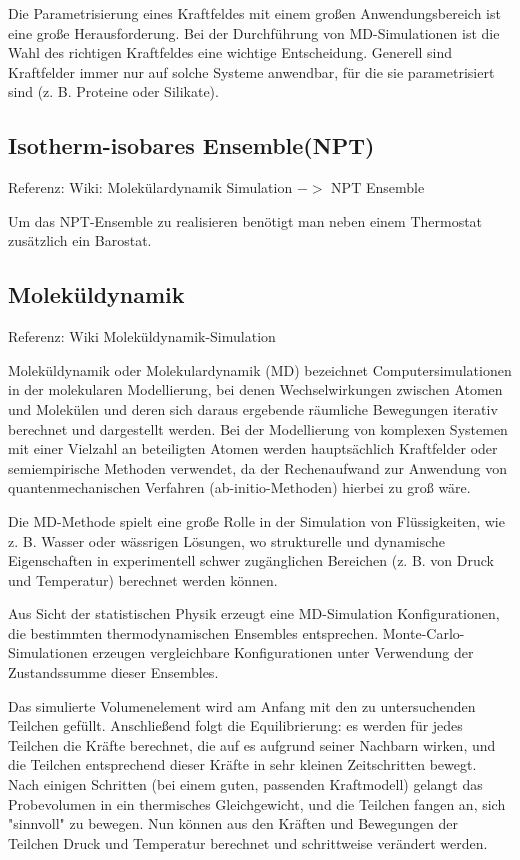 \documentclass[]{article}
\begin{document}
Die Parametrisierung eines Kraftfeldes mit einem großen Anwendungsbereich ist eine große Herausforderung. Bei der Durchführung von MD-Simulationen ist die Wahl des richtigen Kraftfeldes eine wichtige Entscheidung. Generell sind Kraftfelder immer nur auf solche Systeme anwendbar, für die sie parametrisiert sind (z. B. Proteine oder Silikate).

\subsection{Isotherm-isobares Ensemble(NPT)}
Referenz: Wiki: Molekülardynamik Simulation $->$ NPT Ensemble

Um das NPT-Ensemble zu realisieren benötigt man neben einem Thermostat zusätzlich ein Barostat. 

\subsection{Moleküldynamik}
Referenz: Wiki Moleküldynamik-Simulation

Moleküldynamik oder Molekulardynamik (MD) bezeichnet Computersimulationen in der molekularen Modellierung, bei denen Wechselwirkungen zwischen Atomen und Molekülen und deren sich daraus ergebende räumliche Bewegungen iterativ berechnet und dargestellt werden. Bei der Modellierung von komplexen Systemen mit einer Vielzahl an beteiligten Atomen werden hauptsächlich Kraftfelder oder semiempirische Methoden verwendet, da der Rechenaufwand zur Anwendung von quantenmechanischen Verfahren (ab-initio-Methoden) hierbei zu groß wäre.

Die MD-Methode spielt eine große Rolle in der Simulation von Flüssigkeiten, wie z. B. Wasser oder wässrigen Lösungen, wo strukturelle und dynamische Eigenschaften in experimentell schwer zugänglichen Bereichen (z. B. von Druck und Temperatur) berechnet werden können.

Aus Sicht der statistischen Physik erzeugt eine MD-Simulation Konfigurationen, die bestimmten thermodynamischen Ensembles entsprechen.  Monte-Carlo-Simulationen erzeugen vergleichbare Konfigurationen unter Verwendung der Zustandssumme dieser Ensembles.

Das simulierte Volumenelement wird am Anfang mit den zu untersuchenden Teilchen gefüllt. Anschließend folgt die Equilibrierung: es werden für jedes Teilchen die Kräfte berechnet, die auf es aufgrund seiner Nachbarn wirken, und die Teilchen entsprechend dieser Kräfte in sehr kleinen Zeitschritten bewegt. Nach einigen Schritten (bei einem guten, passenden Kraftmodell) gelangt das Probevolumen in ein thermisches Gleichgewicht, und die Teilchen fangen an, sich "sinnvoll" zu bewegen. Nun können aus den Kräften und Bewegungen der Teilchen Druck und Temperatur berechnet und schrittweise verändert werden.
\end{document}
